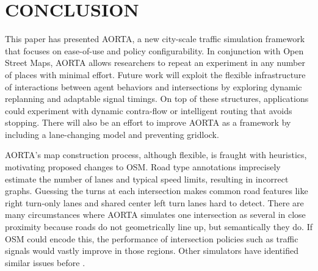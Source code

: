 \documentclass[letterpaper, 10 pt, conference]{ieeeconf}  %
\begin{document}
\section{CONCLUSION}
\label{sec:conclusion}

This paper has presented AORTA, a new city-scale traffic simulation framework
that focuses on ease-of-use and policy configurability. In conjunction with Open
Street Maps, AORTA allows researchers to repeat an experiment in any number of
places with minimal effort. Future work will exploit the flexible infrastructure
of interactions between agent behaviors and intersections by exploring dynamic
replanning and adaptable signal timings. On top of these structures,
applications could experiment with dynamic contra-flow \cite{ITSC11-hausknecht}
or intelligent routing that avoids stopping. There will also be an effort to
improve AORTA as a framework by including a lane-changing model and preventing
gridlock. 

AORTA's map construction process, although flexible, is fraught with heuristics,
motivating proposed changes to OSM. Road type annotations imprecisely estimate
the number of lanes and typical speed limits, resulting in incorrect graphs.
Guessing the turns at each intersection makes common road features like right
turn-only lanes and shared center left turn lanes hard to detect. There are many
circumstances where AORTA simulates one intersection as several in close
proximity because roads do not geometrically line up, but semantically they do.
If OSM could encode this, the performance of intersection policies such as
traffic signals would vastly improve in those regions. Other simulators have
identified similar issues before \cite{Krajzewicz_Hertkorn_Ringel_Wagner_2005}.


\addtolength{\textheight}{-12cm}  %
\end{document}
